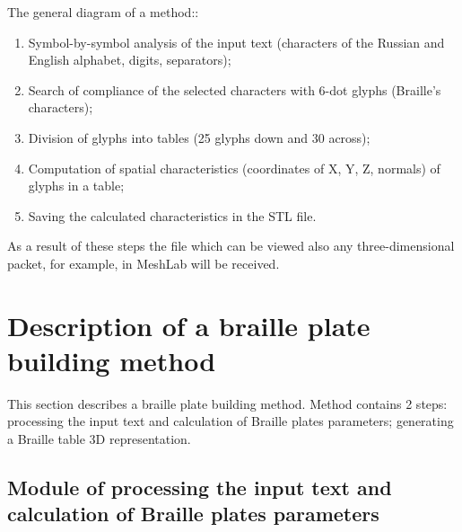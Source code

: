 \documentclass[journal,article,submit,moreauthors,pdftex,10pt,a4paper]{mdpi}
\begin{document}
The general diagram of a method::
\begin{enumerate}[leftmargin=*,labelsep=4.9mm]
\item	Symbol-by-symbol analysis of the input text (characters of the Russian and English alphabet, digits, separators);
\item	Search of compliance of the selected characters with 6-dot glyphs (Braille's characters);
\item Division of glyphs into tables (25 glyphs down and 30 across);
\item	Computation of spatial characteristics (coordinates of X, Y, Z, normals) of glyphs in a table;
\item	Saving the calculated characteristics in the STL file.	
\end{enumerate}

As a result of these steps the file which can be viewed also any three-dimensional packet, for example, in MeshLab will be received.

\section{Description of a braille plate building method}

This section describes a braille plate building method. Method contains 2 steps: processing the input text and calculation of Braille plates parameters; generating a Braille table 3D representation.

\subsection{Module of processing the input text and calculation of Braille plates parameters}
\end{document}
